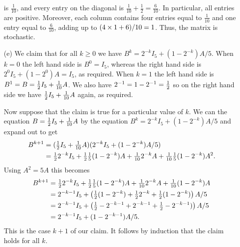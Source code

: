\documentclass[a4paper]{amsart}
\renewenvironment{solution}{\SolutionInline}{\endSolutionInline}
\begin{document}
\begin{solution}
\begin{itemize}
   is $\frac{1}{10}$, and every entry on the diagonal is
   $\frac{1}{10}+\frac{1}{2}=\frac{6}{10}$.  In particular, all
   entries are positive.  Moreover, each column contains four entries
   equal to $\frac{1}{10}$ and one entry equal to $\frac{6}{10}$,
   adding up to $(4\times 1 + 6)/10=1$.  Thus, the matrix is stochastic.
  \item[(e)] We claim that for all $k\geq 0$ we have
   $B^k=2^{-k}I_5+(1-2^{-k})A/5$.  When $k=0$ the left hand side is
   $B^0=I_5$, whereas the right hand side is $2^0I_5+(1-2^0)A=I_5$, as
   required.  When $k=1$ the left hand side is
   $B^1=B=\tfrac{1}{2} I_5+\tfrac{1}{10}A$.  We also have
   $2^{-1}=1-2^{-1}=\tfrac{1}{2}$ so on the right hand side we have
   $\tfrac{1}{2} I_5+\frac{1}{10}A$ again, as required.

   Now suppose that the claim is true for a particular value of $k$.
   We can the equation $B=\tfrac{1}{2} I_5+\tfrac{1}{10}A$ by the equation
   $B^k=2^{-k}I_5+(1-2^{-k})A/5$ and expand out to get
   \begin{align*}
    B^{k+1} &= (\tfrac{1}{2} I_5+\tfrac{1}{10}A)(2^{-k}I_5+(1-2^{-k})A/5) \\
     &= \tfrac{1}{2} 2^{-k}I_5 + \tfrac{1}{2}\tfrac{1}{5}(1-2^{-k})A 
         + \tfrac{1}{10} 2^{-k}A
         + \tfrac{1}{10}\tfrac{1}{5}(1-2^{-k})A^2.
   \end{align*}
   Using $A^2=5A$ this becomes
   \begin{align*}
    B^{k+1} 
     &= \tfrac{1}{2} 2^{-k}I_5 + \tfrac{1}{2}\tfrac{1}{5}(1-2^{-k})A 
         + \tfrac{1}{10} 2^{-k}A
         + \tfrac{1}{10}(1-2^{-k})A \\
     &= 2^{-k-1}I_5 +
         \left(\tfrac{1}{2}(1-2^{-k})+\tfrac{1}{2} 2^{-k}+\tfrac{1}{2}(1-2^{-k})\right)A/5 \\
     &= 2^{-k-1}I_5 +
         \left(\tfrac{1}{2}-2^{-k-1}+2^{-k-1}+\tfrac{1}{2}-2^{-k-1})\right)A/5 \\
     &= 2^{-k-1}I_5 + (1-2^{-k-1})A/5.
   \end{align*}
   This is the case $k+1$ of our claim.  It follows by induction that
   the claim holds for all $k$.
 \end{itemize}
\end{solution}
\end{document}
